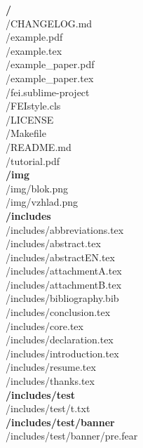 \textbf{/} \\
/CHANGELOG.md \\
/example.pdf \\
/example.tex \\
/example\_paper.pdf \\
/example\_paper.tex \\
/fei.sublime-project \\
/FEIstyle.cls \\
/LICENSE \\
/Makefile \\
/README.md \\
/tutorial.pdf \\
\textbf{/img} \\
/img/blok.png \\
/img/vzhlad.png \\
\textbf{/includes} \\
/includes/abbreviations.tex \\
/includes/abstract.tex \\
/includes/abstractEN.tex \\
/includes/attachmentA.tex \\
/includes/attachmentB.tex \\
/includes/bibliography.bib \\
/includes/conclusion.tex \\
/includes/core.tex \\
/includes/declaration.tex \\
/includes/introduction.tex \\
/includes/resume.tex \\
/includes/thanks.tex \\
\textbf{/includes/test} \\
/includes/test/t.txt \\
\textbf{/includes/test/banner} \\
/includes/test/banner/pre.fear \\
